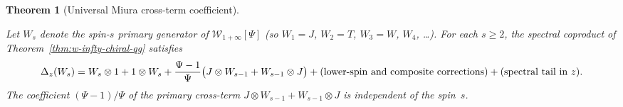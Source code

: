 \documentclass[11pt,reqno]{amsart}
\newtheorem{theorem}{Theorem}[section]
\theoremstyle{definition}
\theoremstyle{remark}
\newcommand{\cW}{\mathcal{W}}
\numberwithin{equation}{section}
\providecommand{\ClaimStatusProvedHere}{}
\begin{document}
\begin{theorem}[Universal Miura cross-term coefficient]
\label{thm:miura-cross-universality}
\ClaimStatusProvedHere
Let $W_s$ denote the spin-$s$ primary generator of
$\cW_{1+\infty}[\Psi]$ (so $W_1 = J$, $W_2 = T$,
$W_3 = W$, $W_4$, \ldots). For each $s \geq 2$,
the spectral coproduct of
Theorem~\textup{\ref{thm:w-infty-chiral-qg}} satisfies
\begin{equation}\label{eq:miura-cross-universal}
  \Delta_z(W_s) = W_s \otimes 1 + 1 \otimes W_s
  + \frac{\Psi - 1}{\Psi}
    \bigl(J \otimes W_{s-1} + W_{s-1} \otimes J\bigr)
  + (\textup{lower-spin and composite corrections})
  + (\textup{spectral tail in~$z$}).
\end{equation}
The coefficient $(\Psi - 1)/\Psi$ of the primary
cross-term $J \otimes W_{s-1} + W_{s-1} \otimes J$
is independent of the spin~$s$.
\end{theorem}
\end{document}
